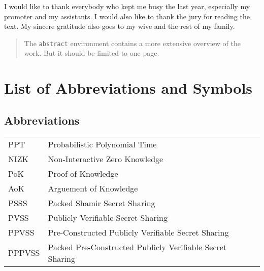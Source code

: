 \documentclass[master=mcs]{kulemt}
\begin{document}
\begin{preface}
  I would like to thank everybody who kept me busy the last year,
  especially my promoter and my assistants. I would also like to thank the
  jury for reading the text. My sincere gratitude also goes to my wive and
  the rest of my family.
\end{preface}

\tableofcontents*

\begin{abstract}
  The \texttt{abstract} environment contains a more extensive overview of
  the work. But it should be limited to one page.

  \lipsum[1]
\end{abstract}

\listoffiguresandtables
\chapter{List of Abbreviations and Symbols}
\section*{Abbreviations}
\begin{flushleft}
  \renewcommand{\arraystretch}{1.1}
  \begin{tabularx}{\textwidth}{@{}p{12mm}X@{}}
    PPT & Probabilistic Polynomial Time \\
    NIZK   & Non-Interactive Zero Knowledge \\
    PoK   & Proof of Knowledge \\
    AoK  & Arguement of Knowledge \\
    PSSS & Packed Shamir Secret Sharing \\
    PVSS & Publicly Verifiable Secret Sharing \\
    PPVSS & Pre-Constructed Publicly Verifiable Secret Sharing \\
    PPPVSS & Packed Pre-Constructed Publicly Verifiable Secret Sharing \\
  \end{tabularx}
\end{flushleft}
\end{document}
